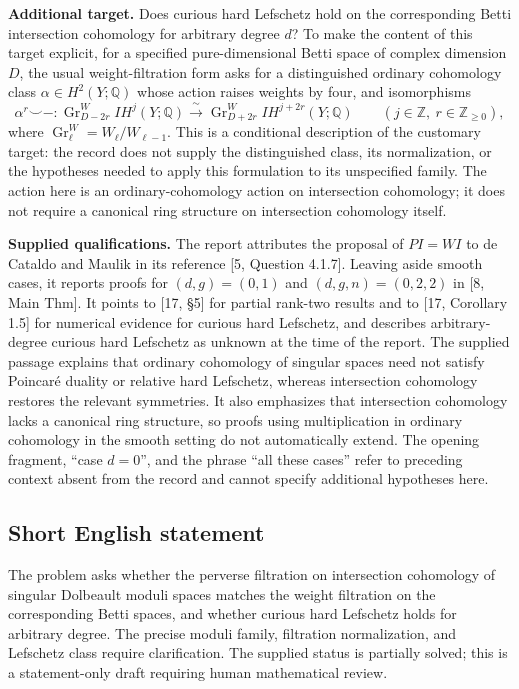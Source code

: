 \documentclass[11pt]{article}
\newcommand{\Z}{\mathbb{Z}}
\newcommand{\Q}{\mathbb{Q}}
\begin{document}
\textbf{Additional target.} Does curious hard Lefschetz hold on the corresponding Betti intersection cohomology for arbitrary degree \(d\)? To make the content of this target explicit, for a specified pure-dimensional Betti space of complex dimension \(D\), the usual weight-filtration form asks for a distinguished ordinary cohomology class \(\alpha\in H^2(Y;\Q)\) whose action raises weights by four, and isomorphisms
\[
\alpha^r\smile-:
\operatorname{Gr}^{W}_{D-2r}IH^j(Y;\Q)
\xrightarrow{\ \sim\ }
\operatorname{Gr}^{W}_{D+2r}IH^{j+2r}(Y;\Q)
\qquad(j\in\Z,\ r\in\Z_{\geq0}),
\]
where \(\operatorname{Gr}^{W}_{\ell}=W_\ell/W_{\ell-1}\). This is a conditional description of the customary target: the record does not supply the distinguished class, its normalization, or the hypotheses needed to apply this formulation to its unspecified family. The action here is an ordinary-cohomology action on intersection cohomology; it does not require a canonical ring structure on intersection cohomology itself.

\textbf{Supplied qualifications.} The report attributes the proposal of \(PI=WI\) to de Cataldo and Maulik in its reference [5, Question 4.1.7]. Leaving aside smooth cases, it reports proofs for \((d,g)=(0,1)\) and \((d,g,n)=(0,2,2)\) in [8, Main Thm]. It points to [17, \S5] for partial rank-two results and to [17, Corollary 1.5] for numerical evidence for curious hard Lefschetz, and describes arbitrary-degree curious hard Lefschetz as unknown at the time of the report. The supplied passage explains that ordinary cohomology of singular spaces need not satisfy Poincar\'e duality or relative hard Lefschetz, whereas intersection cohomology restores the relevant symmetries. It also emphasizes that intersection cohomology lacks a canonical ring structure, so proofs using multiplication in ordinary cohomology in the smooth setting do not automatically extend. The opening fragment, ``case \(d=0\)'', and the phrase ``all these cases'' refer to preceding context absent from the record and cannot specify additional hypotheses here.
\subsection{Short English statement}
The problem asks whether the perverse filtration on intersection cohomology of singular Dolbeault moduli spaces matches the weight filtration on the corresponding Betti spaces, and whether curious hard Lefschetz holds for arbitrary degree. The precise moduli family, filtration normalization, and Lefschetz class require clarification. The supplied status is partially solved; this is a statement-only draft requiring human mathematical review.
\end{document}
